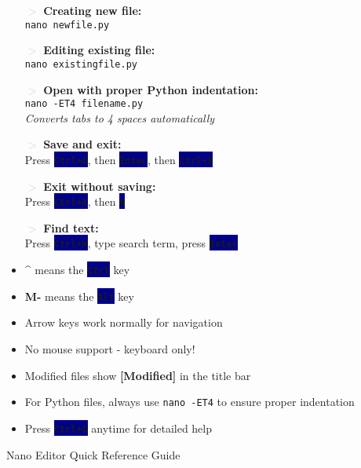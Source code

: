 \documentclass[11pt, a4paper, landscape]{article}
\newcommand{\key}[1]{\colorbox{darkblue}{\color{white}\texttt{\footnotesize\textbf{#1}}}}
\begin{document}
\begin{minipage}[t]{0.48\textwidth}
    \begin{tcolorbox}[colback=lightgray!30, colframe=gray!50, title={\textbf{3. Common Tasks}}, fonttitle=\normalsize\bfseries]
        \begin{itemize}[leftmargin=*]
            \item[\textcolor{lightblue}{$>$}] \textbf{Creating new file:}\\
                \texttt{nano newfile.py}
            \item[\textcolor{lightblue}{$>$}] \textbf{Editing existing file:}\\
                \texttt{nano existingfile.py}
            \item[\textcolor{lightblue}{$>$}] \textbf{Open with proper Python indentation:}\\
                \texttt{nano -ET4 filename.py}\\
                {\footnotesize\textit{Converts tabs to 4 spaces automatically}}
            \item[\textcolor{lightblue}{$>$}] \textbf{Save and exit:}\\
                Press \key{Ctrl+O}, then \key{Enter}, then \key{Ctrl+X}
            \item[\textcolor{lightblue}{$>$}] \textbf{Exit without saving:}\\
                Press \key{Ctrl+X}, then \key{N}
            \item[\textcolor{lightblue}{$>$}] \textbf{Find text:}\\
                Press \key{Ctrl+W}, type search term, press \key{Enter}
        \end{itemize}
        \vspace{28pt}
    \end{tcolorbox}

    \vspace{8pt}

    \begin{tcolorbox}[colback=tipsbg, colframe=lightblue, boxrule=1.5pt, title={\textbf{Important Tips}}, fonttitle=\normalsize\bfseries]
        \begin{itemize}[leftmargin=*, label=\textcolor{lightblue}{$\bullet$}]
            \item \textbf{\^{}} means the \key{Ctrl} key
            \item \textbf{M-} means the \key{Alt} key
            \item Arrow keys work normally for navigation
            \item No mouse support - keyboard only!
            \item Modified files show \textbf{[Modified]} in the title bar
            \item For Python files, always use \texttt{nano -ET4} to ensure proper indentation
            \item Press \key{Ctrl+G} anytime for detailed help
        \end{itemize}
    \end{tcolorbox}
\end{minipage}

\vfill
\begin{center}
    \footnotesize\color{gray}Nano Editor Quick Reference Guide
\end{center}
\end{document}
